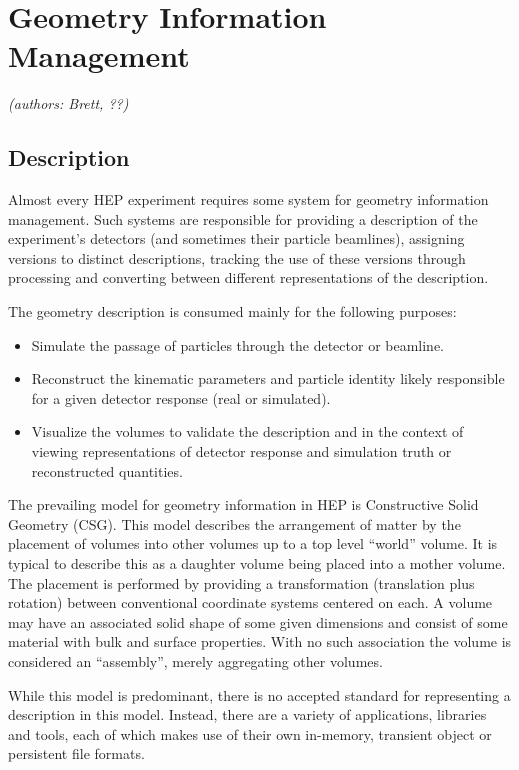 \section{Geometry Information Management}

\textit{(authors: Brett, ??)}

\subsection{Description}

Almost every HEP experiment requires some system for geometry
information management.  Such systems are responsible for providing a
description of the experiment's detectors (and sometimes their
particle beamlines), assigning versions to distinct descriptions,
tracking the use of these versions through processing and converting
between different representations of the description.  

The geometry description is consumed mainly for the following
purposes:

\begin{itemize}
\item Simulate the passage of particles through the detector or
  beamline.  
\item Reconstruct the kinematic parameters and particle identity
  likely responsible for a given detector response (real or
  simulated).
\item Visualize the volumes to validate the description and in the
  context of viewing representations of detector response and
  simulation truth or reconstructed quantities.
\end{itemize}

The prevailing model for geometry information in HEP is Constructive
Solid Geometry (CSG).  This model describes the arrangement of matter
by the placement of volumes into other volumes up to a top level
``world'' volume.  It is typical to describe this as a daughter volume
being placed into a mother volume.  The placement is performed by
providing a transformation (translation plus rotation) between
conventional coordinate systems centered on each.  A volume may have
an associated solid shape of some given dimensions and consist of some
material with bulk and surface properties.  With no such association
the volume is considered an ``assembly'', merely aggregating other
volumes.

While this model is predominant, there is no accepted standard for
representing a description in this model.  Instead, there are a
variety of applications, libraries and tools, each of which makes use
of their own in-memory, transient object or persistent file formats.  

